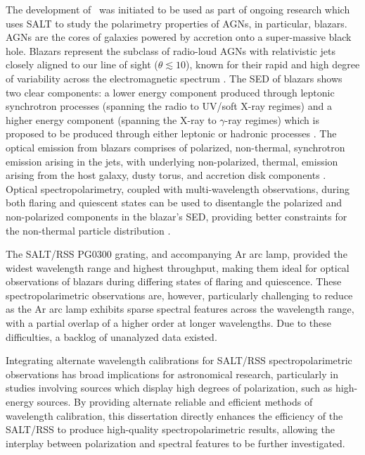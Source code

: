 The development of \stops\ was initiated to be used as part of ongoing research which uses \gls{SALT} to study the polarimetry properties of \glspl{AGN}, in particular, blazars.
\Glspl{AGN} are the cores of galaxies powered by accretion onto a super-massive black hole.
Blazars represent the subclass of radio-loud \glspl{AGN} with relativistic jets closely aligned to our line of sight ($\theta \lesssim 10$\degree), known for their rapid and high degree of variability across the electromagnetic spectrum \citep{Urry_1995}.
The \gls{SED} of blazars shows two clear components:
a lower energy component produced through leptonic synchrotron processes (spanning the radio to \gls{UV}/soft X-ray regimes)
and a higher energy component (spanning the X-ray to $\gamma$-ray regimes) which is proposed to be produced through either leptonic or hadronic processes \citep{Bottcher_2013}.
%
The optical emission from blazars comprises of polarized, non-thermal, synchrotron emission arising in the jets, with underlying non-polarized, thermal, emission arising from the host galaxy, dusty torus, and accretion disk components  \citep{Ghisellini_2009}.
Optical spectropolarimetry, coupled with multi-wavelength observations, during both flaring and quiescent states can be used to disentangle the polarized and non-polarized components in the blazar's \gls{SED}, providing better constraints for the non-thermal particle distribution \citep{Schutte_COSPAR, Schutte4C0102}.

The \gls{SALT}/\gls{RSS} PG$0300$ grating, and accompanying \gls{Ar} arc lamp, provided the widest wavelength range and highest throughput, making them ideal for optical observations of blazars during differing states of flaring and quiescence.
These spectro\-polarimetric observations are, however, particularly challenging to reduce as the \gls{Ar} arc lamp exhibits sparse spectral features across the wavelength range, with a partial overlap of a higher order at longer wavelengths.
Due to these difficulties, a backlog of unanalyzed data existed.



Integrating alternate wavelength calibrations for \gls{SALT}/\gls{RSS} spectro\-polarimetric observations has broad implications for astronomical research, particularly in studies involving sources which display high degrees of polarization, such as high-energy sources.
By providing alternate reliable and efficient methods of wavelength calibration, this dissertation directly enhances the efficiency of the \gls{SALT}/\gls{RSS} to produce high-quality spectropolarimetric results, allowing the interplay between polarization and spectral features to be further investigated.

